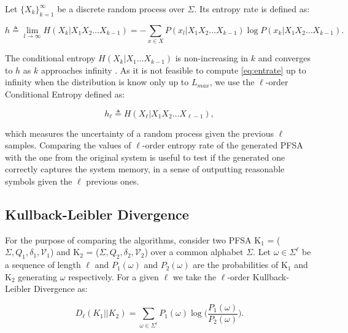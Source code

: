 {Let $\{X_k\}_{k=1}^{\infty}$ be a discrete random process over $\Sigma$. Its entropy rate is defined as:

\begin{equation}
h \triangleq \lim_{l\rightarrow\infty}H(X_k|X_1X_2\ldots X_{k-1}) = -\sum_{x\in X}P(x_l|X_1X_2\ldots X_{k-1})\log P(x_k|X_1X_2\ldots X_{k-1}).  \label{eq:entrate}
\end{equation}

The conditional entropy $H(X_k|X_1\ldots X_{k-1})$ is non-increasing in $k$ and converges to $h$ as $k$ approaches infinity \citep{cover2012elements}. As it is not feasible to compute \ref{eq:entrate} up to infinity when the distribution is know only up to $L_{max}$, we use the $\ell$-order Conditional Entropy defined as:

\begin{equation}
h_{\ell} \triangleq H(X_{\ell}|X_1X_2\ldots X_{\ell-1}),   \label{eq:entratel}
\end{equation}

\noindent which measures the uncertainty of a random process given the previous $\ell$ samples.  Comparing the values of $\ell$-order entropy rate of the generated PFSA with the one from the original system is useful to test if the generated one correctly captures the system memory, in a sense of outputting reasonable symbols given the $\ell$ previous ones.

\subsection{Kullback-Leibler Divergence}\label{sec:kld}

%

For the purpose of comparing the algorithms, consider two PFSA K$_1$ = ($\Sigma, Q_1, \delta_1, \mathcal{V}_1$) and K$_2$ = ($\Sigma, Q_2, \delta_2, \mathcal{V}_2$) over a common alphabet $\Sigma$. Let $\omega\in\Sigma^{\ell}$ be a sequence of length $\ell$ and $P_1(\omega)$ and $P_2(\omega)$ are the probabilities of K$_1$ and K$_2$ generating $\omega$ respectively. For a given $\ell$ we take the $\ell$-order Kullback-Leibler Divergence as: 

\begin{equation}
D_{\ell}(K_1||K_2) = \sum_{\omega\in\Sigma^{\ell}}P_1(\omega)\log\Big(\frac{P_1(\omega)}{P_2(\omega)}\Big).	\label{eq:kldl}
\end{equation}

}
